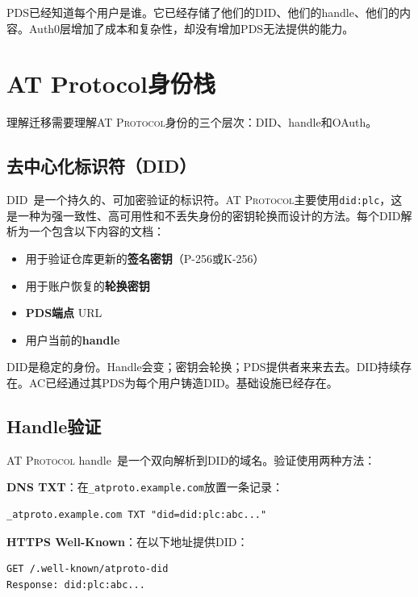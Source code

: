 \documentclass[10pt,letterpaper,twocolumn]{article}
\newcommand{\atproto}{\textsc{AT Protocol}}
\begin{document}
PDS已经知道每个用户是谁。它已经存储了他们的DID、他们的handle、他们的内容。Auth0层增加了成本和复杂性，却没有增加PDS无法提供的能力。


\section{AT Protocol身份栈}
\label{sec:atproto}

理解迁移需要理解\atproto{}身份的三个层次：DID、handle和OAuth。

\subsection{去中心化标识符（DID）}

DID~\citep{w3cdid2022, atproto2024did}是一个持久的、可加密验证的标识符。\atproto{}主要使用\texttt{did:plc}，这是一种为强一致性、高可用性和不丢失身份的密钥轮换而设计的方法。每个DID解析为一个包含以下内容的文档：

\begin{itemize}
  \item 用于验证仓库更新的\textbf{签名密钥}（P-256或K-256）~\citep{atproto2024crypto}
  \item 用于账户恢复的\textbf{轮换密钥}
  \item \textbf{PDS端点} URL
  \item 用户当前的\textbf{handle}
\end{itemize}

DID是稳定的身份。Handle会变；密钥会轮换；PDS提供者来来去去。DID持续存在。AC已经通过其PDS为每个用户铸造DID。基础设施已经存在。

\subsection{Handle验证}

\atproto{} handle~\citep{atproto2024handle}是一个双向解析到DID的域名。验证使用两种方法：

\textbf{DNS TXT}：在\texttt{\_atproto.example.com}放置一条记录：
\begin{lstlisting}
_atproto.example.com TXT "did=did:plc:abc..."
\end{lstlisting}

\textbf{HTTPS Well-Known}：在以下地址提供DID：
\begin{lstlisting}
GET /.well-known/atproto-did
Response: did:plc:abc...
\end{lstlisting}
\end{document}

